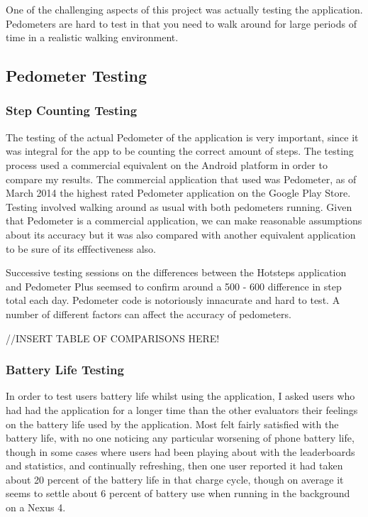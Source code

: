 \documentclass{l4proj}
\begin{document}
One of the challenging aspects of this project was actually testing the application. Pedometers are hard to test in that you need to walk around for large periods of time in a realistic walking environment.

\subsection{Pedometer Testing}

\subsubsection{Step Counting Testing}

The testing of the actual Pedometer of the application is very important, since it was integral for the app to be counting the correct amount of steps. The testing process used a commercial equivalent on the Android platform in order to compare my results. The commercial application that used was Pedometer, as of March 2014 the highest rated Pedometer application on the Google Play Store. Testing involved walking around as usual with both pedometers running. Given that Pedometer is a commercial application, we can make reasonable assumptions about its accuracy but it was also compared with another equivalent application to be sure of its efffectiveness also.

Successive testing sessions on the differences between the Hotsteps application and Pedometer Plus seemsed to confirm around a 500 - 600 difference in step total each day. Pedometer code is notoriously innacurate and hard to test. A number of different factors can affect the accuracy of pedometers.

//INSERT TABLE OF COMPARISONS HERE!

\subsubsection{Battery Life Testing}

In order to test users battery life whilst using the application, I asked users who had had the application for a longer time than the other evaluators their feelings on the battery life used by the application. Most felt fairly satisfied with the battery life, with no one noticing any particular worsening of phone battery life, though in some cases where users had been playing about with the leaderboards and statistics, and continually refreshing, then one user reported it had taken about 20 percent of the battery life in that charge cycle, though on average it seems to settle about 6 percent of battery use when running in the background on a Nexus 4.
\end{document}
